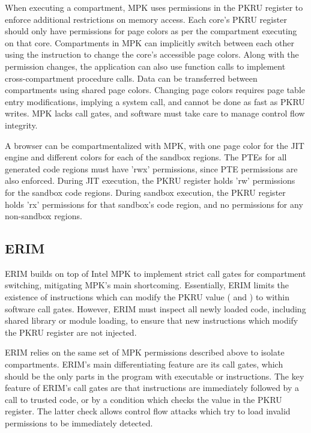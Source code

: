 When executing a compartment, MPK uses permissions in the PKRU register
to enforce additional restrictions on memory access. 
Each core's PKRU register should only have permissions for page colors as
per the compartment executing on that core.
Compartments in MPK can implicitly switch between each other using the 
 instruction to change the core's accessible page colors.
Along with the permission changes, the application can also use 
function calls to implement cross-compartment procedure calls.
Data can be transferred between compartments using shared page colors.
Changing page colors requires page table entry modifications, implying a
system call, and cannot be done as fast as PKRU writes.
MPK lacks call gates, and software must take care to manage control flow
integrity.

A browser can be compartmentalized with MPK, with one page color for the JIT
engine and different colors for each of the sandbox regions.
The PTEs for all generated code regions must have 'rwx' permissions, 
since PTE permissions are also enforced.
During JIT execution, the PKRU register holds 'rw' permissions for the
sandbox code regions.
During sandbox execution, the PKRU register holds 'rx' permissions for that
sandbox's code region, and no permissions for any non-sandbox regions.

\subsection{ERIM}
ERIM builds on top of Intel MPK to implement strict call gates for
compartment switching, mitigating MPK's main shortcoming.
Essentially, ERIM limits the existence of instructions which can
modify the PKRU value ( and ) to within
software call gates.
However, ERIM must inspect all newly loaded code, including shared
library or module loading, to ensure that new instructions which
modify the PKRU register are not injected.

ERIM relies on the same set of MPK permissions described above to
isolate compartments.
ERIM's main differentiating feature are its call gates, which should
be the only parts in the program with executable  or
 instructions.
The key feature of ERIM's call gates are that  instructions
are immediately followed by a call to trusted code, or by a condition which
checks the value in the PKRU register. 
The latter check allows control flow attacks which try to load invalid
permissions to be immediately detected.

